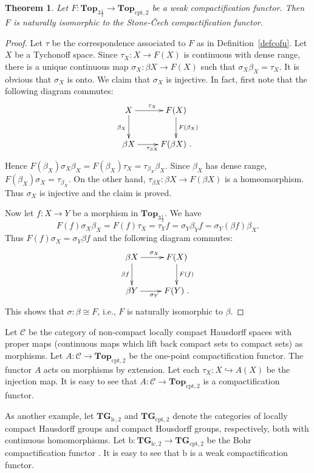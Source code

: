 \documentclass[manuscript]{amsart}
\newtheorem{theorem}{Theorem}[section]
\theoremstyle{definition}
\begin{document}
\begin{theorem}
Let $F: \mathbf{Top}_{3\frac{1}{2}}\to \mathbf{Top}_{\mathrm{cpt,2}}$
be a weak compactification functor. Then
$F$ is naturally isomorphic to the Stone-\v{C}ech compactification functor.
\end{theorem}
\begin{proof}
Let $\tau$ be the correspondence associated to $F$ as in Definition~\ref{defcofu}.
Let $X$ be a Tychonoff space.
Since $\tau_{X}:  X\to F( X)$ is continuous with dense range,
there is a unique continuous map
$\sigma_{X}:\beta X\to F(X)$ such that $\sigma_{X}\beta_{X}=\tau_{X}$.
It is obvious that $\sigma_{X}$ is onto. We claim that $\sigma_{X}$ is injective.
In fact, first note that the following diagram commutes:
\[
\xymatrix{
X \ar[d]_{\beta_{X}}\ar[r]^{\tau_{X}} & F(X) \ar[d]^{F(\beta_{X})} \\
\beta X\ar[r]_{\tau_{\beta X}}  & F(\beta X)\ .
}
\]
Hence  $F(\beta_{X})\sigma_{X}\beta_{X}=F(\beta_{X})\tau_{X}=\tau_{\beta_{X}}\beta_{X}$.
Since $\beta_{X}$ has dense range,
$F(\beta_{X})\sigma_{X}=\tau_{\beta_{X}}$.
On the other hand, $\tau_{\beta X}:\beta X\to   F(\beta X)$ is a homeomorphism.
Thus $\sigma_{X}$ is injective and the claim is proved.

Now let
$f:X\to Y$ be a morphism in $ \mathbf{Top}_{3\frac{1}{2}}$.
We have
\[
F(f)\sigma_{X}\beta_{X}=F(f)\tau_{X}=\tau_{Y}f=
\sigma_{Y}\beta_{Y}f=\sigma_{Y}(\beta f)\beta_{X}.
\]
Thus $F(f)\sigma_{X}=\sigma_{Y}\beta f$ and the following diagram commutes:
\[
\xymatrix{
\beta X \ar[d]_{\beta f}\ar[r]^{\sigma_{X}} & F(X) \ar[d]^{F(f)} \\
\beta Y\ar[r]_{\sigma_{Y}}  & F(Y)\ .
}
\]
This shows that $\sigma:\beta\cong F$, i.e., $F$ is naturally isomorphic to $\beta$.
\end{proof}

Let $\mathcal{C}$ be the category of non-compact locally compact Hausdorff spaces with
proper maps
(continuous maps which lift back compact sets to compact sets) as morphisms.
Let $A: \mathcal{C}\to \mathbf{Top}_{\mathrm{cpt,2}}$ be the one-point compactification
functor. The functor $A$ acts on morphisms by extension.
Let each $\tau_{X}:X\hookrightarrow A(X)$ be the injection map.
It is easy to see that
$A: \mathcal{C}\to \mathbf{Top}_{\mathrm{cpt,2}}$ is a compactification functor.

As another example, let $\mathbf{TG}_{\mathrm{lc,2}}$ and $\mathbf{TG}_{\mathrm{cpt,2}}$
denote the categories of locally compact Hausdorff  groups and
compact Housdorff groups, respectively, both with
continuous homomorphisms. Let
$\mathrm{b}: \mathbf{TG}_{\mathrm{lc,2}}\to\mathbf{TG}_{\mathrm{cpt,2}}$
be the  Bohr compactification functor \cite{fo95}. It is
easy to see that $\mathrm{b}$ is a weak compactification functor.
\end{document}

